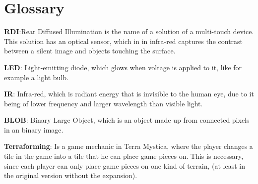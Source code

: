 \chapter*{Glossary}\label{gloss}

\textbf{RDI}:Rear Diffused Illumination is the name of a solution of a multi-touch device\citep{multiTT}. This solution has an optical sensor, which in in infra-red captures the contrast between a silent image and objects touching the surface. 

\textbf{LED}: Light-emitting diode, which glows when voltage is applied to it, like for example a light bulb.

\textbf{IR}: Infra-red, which is radiant energy that is invisible to the human eye, due to it being of lower frequency and larger wavelength than visible light.

\textbf{BLOB}: Binary Large Object, which is an object made up from connected pixels in an binary image. 

\textbf{Terraforming}: Is a game mechanic in Terra Mystica, where the player changes a tile in the game into a tile that he can place game pieces on. This is necessary, since each player can only place game pieces on one kind of terrain, (at least in the original version without the expansion).